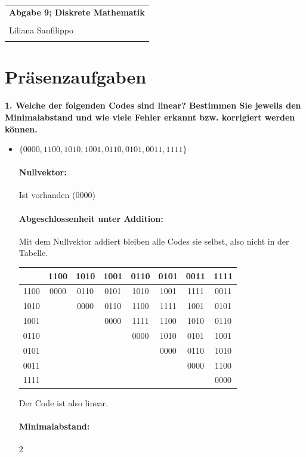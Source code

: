 \documentclass{article} %
\newcommand{\titulo}{Abgabe 9; Diskrete Mathematik}
\newcommand{\nombre}{Liliana Sanfilippo}
\begin{document}
\begin{tabular}{p{12cm}}
{{\Large\bf\titulo}}\\
\vspace{0.2cm}\\
 {\large\nombre}\\
 \vspace{0.1cm}
\end{tabular}
\section*{Präsenzaufgaben}

\textbf{1. Welche der folgenden Codes sind linear? Bestimmen Sie jeweils den Minimalabstand und wie viele Fehler erkannt bzw. korrigiert werden können.}
\begin{itemize}
  \item[(a)] \( \{0000, 1100, 1010, 1001, 0110, 0101, 0011, 1111\} \)
  \begin{mybox}
  \paragraph{Nullvektor:}
  Ist vorhanden (0000) 
  \paragraph{Abgeschlossenheit unter Addition:}
Mit dem Nullvektor addiert bleiben alle Codes sie selbst, also nicht in der Tabelle.  
  \begin{table}[H]
      \centering
      \begin{tabular}{c|ccccccc}
        & 1100 & 1010 & 1001 & 0110 & 0101 & 0011 & 1111\\ \hline
    1100& 0000 & 0110 & 0101 & 1010 & 1001 & 1111 & 0011\\
    1010&  & 0000 & 0110 & 1100 & 1111 & 1001 & 0101\\
    1001&  &  & 0000 & 1111 & 1100 & 1010 & 0110\\
    0110&  &  &  & 0000 & 1010 & 0101 & 1001\\
    0101&  &  &  &  & 0000 & 0110 & 1010 \\
    0011&  &  &  &  &  & 0000 & 1100\\
    1111&  &  &  &  &  &  & 0000
      \end{tabular}
  \end{table}
  Der Code ist also linear. 
  \paragraph{Minimalabstand:} 2

\end{mybox}
\end{itemize}
\end{document}
